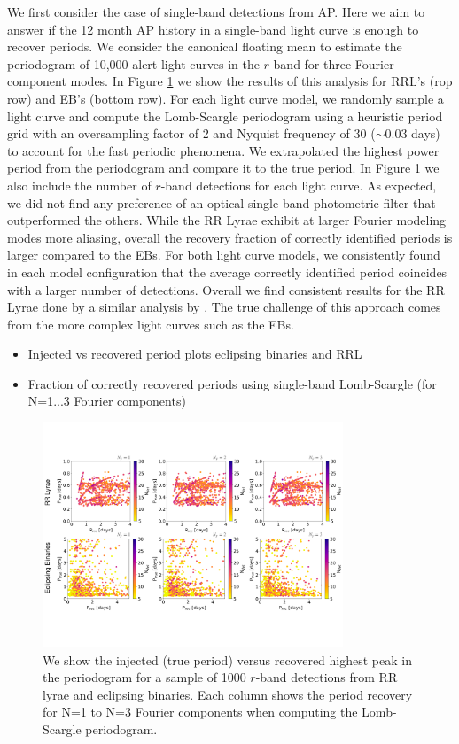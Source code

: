 \documentclass[DM,authoryear,toc]{lsstdoc}
\begin{document}
We first consider the case of single-band detections from AP. Here we aim to answer if the 12 month AP history in a single-band light curve is enough to recover periods. We consider the canonical floating mean to estimate the periodogram of 10,000 alert light curves in the $r$-band for three Fourier component modes. In Figure \ref{fig:single_band_lsp} we show the results of this analysis for RRL's (rop row) and EB's (bottom row). For each light curve model, we randomly sample a light curve and compute the Lomb-Scargle periodogram using a heuristic period grid with an oversampling factor of 2 and Nyquist frequency of 30 ($\sim$0.03 days) to account for the fast periodic phenomena. We extrapolated the highest power period from the periodogram and compare it to the true period. In Figure \ref{fig:single_band_lsp} we also include the number of $r$-band detections for each light curve. As expected, we did not find any preference of an optical single-band photometric filter that outperformed the others. While the RR Lyrae exhibit at larger Fourier modeling modes more aliasing, overall the recovery fraction of correctly identified periods is larger compared to the EBs. For both light curve models, we consistently found in each model configuration that the average correctly identified period coincides with a larger number of detections. Overall we find consistent results for the RR Lyrae done by a similar analysis by \citet{VanderPlas:VP2015}. The true challenge of this approach comes from the more complex light curves such as the EBs. 


\begin{itemize}
\item Injected vs recovered period plots eclipsing binaries and RRL
\item Fraction of correctly recovered periods using single-band Lomb-Scargle (for N=1...3 Fourier components)  
\end{itemize}

\begin{figure}
  \includegraphics[width=0.8\textwidth]{figures/singleband_lsp.pdf}
  \centering 
  \caption{We show the injected (true period) versus recovered highest peak in the periodogram for a sample of 1000 $r$-band detections from RR lyrae and eclipsing binaries. Each column shows the period recovery for N=1 to N=3 Fourier components when computing the Lomb-Scargle periodogram.}
  \label{fig:single_band_lsp}
\end{figure}
\end{document}

